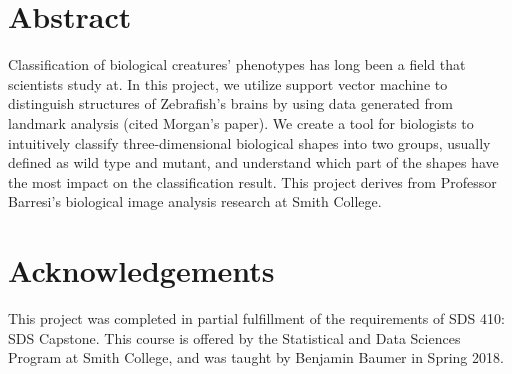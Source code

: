 \documentclass[10pt,letterpaper]{article}
\date{}
\newcommand{\getIndex}[2]{
  \ForEach{,}{\IfEq{#1}{\thislevelitem}{\number\thislevelcount\ExitForEach}{}}{#2}
}
\newcommand{\getAff}[1]{
  \getIndex{#1}{Smith College}
}
\begin{document}
\vspace*{0.2in}

\section*{Abstract}
Classification of biological creatures' phenotypes has long been a field
that scientists study at. In this project, we utilize support vector
machine to distinguish structures of Zebrafish's brains by using data
generated from landmark analysis (cited Morgan's paper). We create a
tool for biologists to intuitively classify three-dimensional biological
shapes into two groups, usually defined as wild type and mutant, and
understand which part of the shapes have the most impact on the
classification result. This project derives from Professor Barresi's
biological image analysis research at Smith College.


\linenumbers

\section{Acknowledgements}\label{acknowledgements}

This project was completed in partial fulfillment of the requirements of
SDS 410: SDS Capstone. This course is offered by the Statistical and
Data Sciences Program at Smith College, and was taught by Benjamin
Baumer in Spring 2018.
\end{document}
